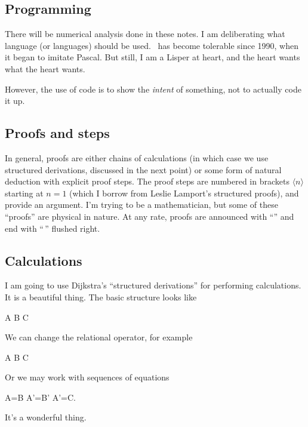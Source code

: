 \subsection*{Programming} There will be numerical analysis done in these
notes. I am deliberating what language (or languages) should be
used. \FORTRAN\ has become tolerable since 1990, when it began to
imitate Pascal. But still, I am a Lisper at heart, and the heart wants
what the heart wants.

However, the use of code is to show the \emph{intent} of something, not
to actually code it up.

\subsection*{Proofs and steps} In general, proofs are either chains of
calculations (in which case we use structured derivations, discussed in
the next point) or some form of natural deduction with explicit proof
steps. The proof steps are numbered in brackets $\langle n\rangle$
starting at $n=1$ (which I borrow from Leslie Lamport's structured
proofs), and provide an argument. I'm trying to be a mathematician, but
some of these ``proofs'' are physical in nature. At any rate, proofs are
announced with ``\textsc{\proofname}'' and end with ``\qedsymbol\,''
flushed right.

\subsection*{Calculations} I am going to use Dijkstra's ``structured
derivations'' for performing calculations. It is a beautiful thing. The
basic structure looks like
\begin{calculation}
  A
  B
  C
\end{calculation}
We can change the relational operator, for example
\begin{calculation}
  A
  B
  C
\end{calculation}
Or we may work with sequences of equations
\begin{calculation}
  A=B
  A'=B'
  A'=C.
\end{calculation}
It's a wonderful thing.